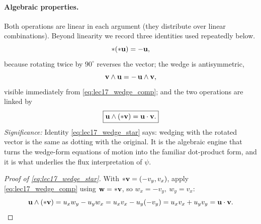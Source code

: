 \documentclass[../main.tex]{subfiles}
\begin{document}
\paragraph{Algebraic properties.} Both operations are linear in each argument (they distribute over linear combinations). Beyond linearity we record three identities used repeatedly below.
\begin{equation}
  \ast(\ast\mathbf{u}) = -\mathbf{u},
  \label{eq:lec17_star_star}
\end{equation}
because rotating twice by $90^\circ$ reverses the vector; the wedge is antisymmetric,
\begin{equation}
  \mathbf{v}\wedge\mathbf{u} = -\,\mathbf{u}\wedge\mathbf{v},
  \label{eq:lec17_wedge_antisym}
\end{equation}
visible immediately from \eqref{eq:lec17_wedge_comp}; and the two operations are linked by
\begin{equation}
  \boxed{\mathbf{u}\wedge(\ast\mathbf{v}) = \mathbf{u}\cdot\mathbf{v}.}
  \label{eq:lec17_wedge_star}
\end{equation}
\textit{Significance:} Identity \eqref{eq:lec17_wedge_star} says: wedging with the rotated vector is the same as dotting with the original. It is the algebraic engine that turns the wedge-form equations of motion into the familiar dot-product form, and it is what underlies the flux interpretation of $\psi$.

\begin{proof}[Proof of \eqref{eq:lec17_wedge_star}]
With $\ast\mathbf{v}=(-v_y,v_x)$, apply \eqref{eq:lec17_wedge_comp} using $\mathbf{w}=\ast\mathbf{v}$, so $w_x=-v_y,\ w_y=v_x$:
\[
  \mathbf{u}\wedge(\ast\mathbf{v}) = u_x w_y - u_y w_x = u_x v_x - u_y(-v_y) = u_x v_x + u_y v_y = \mathbf{u}\cdot\mathbf{v}. \qedhere
\]
\end{proof}
\end{document}
